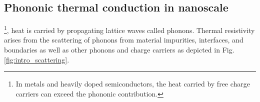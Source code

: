 



\subsection{Phononic thermal conduction in nanoscale}
\label{sec:intro_vib}



\footnote{In metals and heavily doped semiconductors, the heat carried by free charge carriers can exceed the phononic contribution.}, heat is carried by propagating lattice waves called phonons. Thermal resistivity arises from the scattering of phonons from material impurities, interfaces, and boundaries as well as other phonons and charge carriers \cite{peierls29,ziman} as depicted in Fig. \ref{fig:intro_scattering}. %

